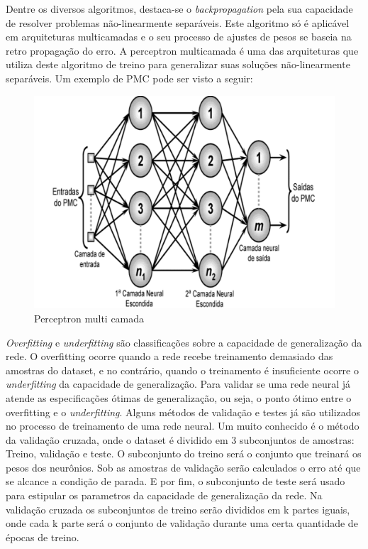 Dentre os diversos algoritmos, destaca-se o \textit{backpropagation} pela sua capacidade de resolver problemas não-linearmente separáveis. Este algoritmo só é aplicável em arquiteturas multicamadas e o seu processo de ajustes de pesos se baseia na retro propagação do erro. A perceptron multicamada é uma das arquiteturas que utiliza deste algoritmo de treino para generalizar suas soluções não-linearmente separáveis. Um exemplo de PMC pode ser visto a seguir:
\begin{figure}[H]
	\centering
    \label{fig4}
    \vspace{3ex}%
	\includegraphics[scale=0.4,angle=-90]{pasta1_figuras/pmc.pdf}
    \caption{Perceptron multi camada}
\end{figure}

\textit{Overfitting} e \textit{underfitting} são classificações sobre a capacidade de generalização da rede. O overfitting ocorre quando a rede recebe treinamento demasiado das amostras do dataset, e no contrário, quando o treinamento é insuficiente ocorre o \textit{underfitting} da capacidade de generalização. Para validar se uma rede neural já atende as especificações ótimas de generalização, ou seja, o ponto ótimo entre o overfitting e o \textit{underfitting}. Alguns métodos de validação e testes já são utilizados no processo de treinamento de uma rede neural. Um muito conhecido é o método da validação cruzada, onde o dataset é dividido em 3 subconjuntos de amostras: Treino, validação e teste. O subconjunto do treino será o conjunto que treinará os pesos dos neurônios. Sob as amostras de validação serão calculados o erro até que se alcance a condição de parada. E por fim, o subconjunto de teste será usado para estipular os parametros da capacidade de generalização da rede. Na validação cruzada os subconjuntos de treino serão divididos em k partes iguais, onde cada k parte será o conjunto de validação durante uma certa quantidade de épocas de treino.
